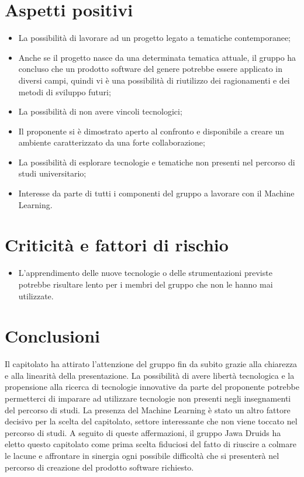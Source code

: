 \section{Aspetti positivi}
\begin{itemize}
	\item La possibilità di lavorare ad un progetto legato a tematiche contemporanee;
	\item Anche se il progetto nasce da una determinata tematica attuale, il gruppo ha concluso che un prodotto software del genere potrebbe essere applicato in diversi campi, quindi vi è una possibilità di riutilizzo dei ragionamenti e dei metodi di sviluppo futuri;
	\item La possibilità di non avere vincoli tecnologici;
	\item Il proponente si è dimostrato aperto al confronto e disponibile a creare un ambiente caratterizzato da una forte collaborazione;
	\item La possibilità di esplorare tecnologie e tematiche non presenti nel percorso di studi universitario;
	\item Interesse da parte di tutti i componenti del gruppo a lavorare con il Machine Learning.
\end{itemize}
\section{Criticità e fattori di rischio}
\begin{itemize}
	\item L'apprendimento delle nuove tecnologie o delle strumentazioni previste potrebbe risultare lento per i membri del gruppo che non le hanno mai utilizzate.
\end{itemize}
\section{Conclusioni}
Il capitolato ha attirato l'attenzione del gruppo fin da subito grazie alla chiarezza e alla linearità della presentazione. La possibilità di avere libertà tecnologica e la propensione alla ricerca di tecnologie innovative da parte del proponente potrebbe permetterci di imparare ad utilizzare tecnologie non presenti negli insegnamenti del percorso di studi. La presenza del Machine Learning è stato un altro fattore decisivo per la scelta del capitolato, settore interessante che non viene toccato nel percorso di studi. A seguito di queste affermazioni, il gruppo Jawa Druids ha eletto questo capitolato come prima scelta fiduciosi del fatto di riuscire a colmare le lacune e affrontare in sinergia ogni possibile difficoltà che si presenterà nel percorso di creazione del prodotto software richiesto.